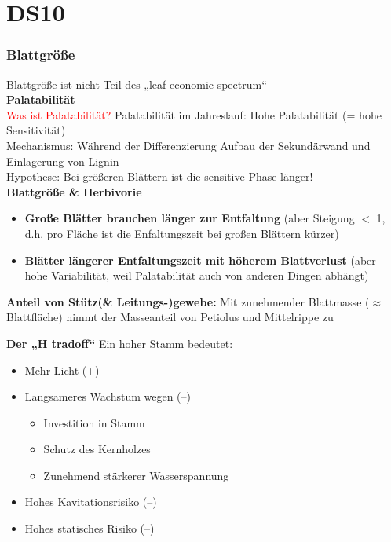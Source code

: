 \section{DS10}
\subsubsection{Blattgröße}
Blattgröße ist nicht Teil des „leaf economic spectrum“\\

\textbf{Palatabilität}\\
\textcolor{red}{Was ist Palatabilität?}
Palatabilität im Jahreslauf: Hohe Palatabilität (= hohe Sensitivität)\\
Mechanismus: Während der Differenzierung Aufbau der Sekundärwand und Einlagerung von Lignin\\
Hypothese: Bei größeren Blättern ist die sensitive Phase länger!\\

\textbf{Blattgröße \& Herbivorie}
\begin{itemize}
	\item \textbf{Große Blätter brauchen länger zur Entfaltung} (aber Steigung $<$ 1, d.h. pro Fläche ist die Enfaltungszeit bei großen Blättern kürzer)
	\item \textbf{Blätter längerer Entfaltungszeit mit höherem Blattverlust} (aber hohe Variabilität, weil Palatabilität auch von anderen Dingen abhängt)
\end{itemize}

\textbf{Anteil von Stütz(\& Leitungs-)gewebe:} Mit zunehmender Blattmasse ($\approx$ Blattfläche) nimmt der Masseanteil von Petiolus und Mittelrippe zu

\newpage
\textbf{Der „H tradoff“}
Ein hoher Stamm bedeutet:
\begin{itemize}
	\item Mehr Licht (+)
	\item Langsameres Wachstum wegen (–)
	\begin{itemize}
		\item Investition in Stamm
		\item Schutz des Kernholzes
		\item Zunehmend stärkerer Wasserspannung
	\end{itemize}
	\item Hohes Kavitationsrisiko (–)
	\item Hohes statisches Risiko (–)
\end{itemize}

